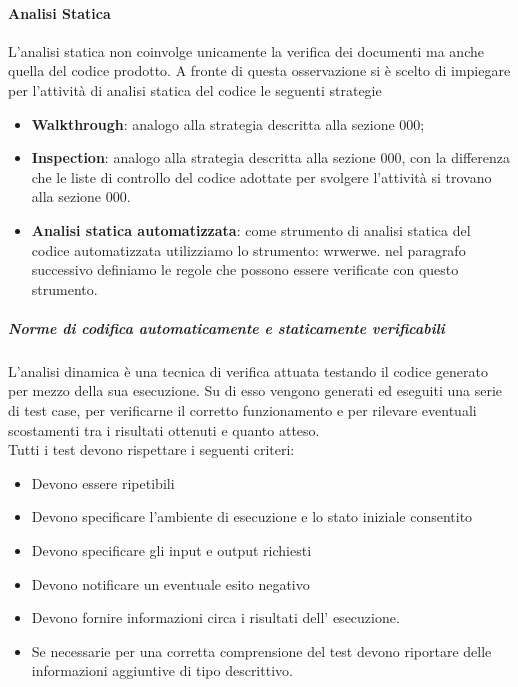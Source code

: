 			\paragraph{Analisi Statica}
				L’analisi statica non coinvolge unicamente la verifica dei documenti ma anche quella del codice prodotto. A fronte di questa osservazione si è scelto di impiegare per l’attività di analisi statica del codice le seguenti strategie
				\begin{itemize}
					\item\textbf{Walkthrough}: analogo alla strategia descritta alla sezione 000;
					\item\textbf{Inspection}: analogo alla strategia descritta alla sezione 000, con la differenza che le liste di controllo del codice adottate per svolgere l’attività si trovano alla sezione 000.
					\item\textbf{Analisi statica automatizzata}: come strumento di analisi statica del codice automatizzata utilizziamo lo strumento: wrwerwe. nel paragrafo successivo definiamo le regole che possono essere verificate con questo strumento.
				\end{itemize}
				\subparagraph{Norme di codifica automaticamente e staticamente verificabili}
			\paragraph{}
				L’analisi dinamica è una tecnica di verifica attuata testando il codice generato per mezzo della sua esecuzione. Su di esso vengono generati ed eseguiti una serie di test case, per verificarne il corretto funzionamento e per rilevare eventuali scostamenti tra i risultati ottenuti e quanto atteso. \\
				Tutti i test devono rispettare i seguenti criteri: \\
				\begin{itemize}
					\item Devono essere ripetibili
					\item Devono specificare l’ambiente di esecuzione e lo stato iniziale consentito
					\item Devono specificare gli input e output richiesti
					\item Devono notificare un eventuale esito negativo
					\item Devono fornire informazioni circa i risultati dell’ esecuzione.
					\item Se necessarie per una corretta comprensione del test devono riportare delle informazioni aggiuntive di tipo descrittivo.
				\end{itemize}
